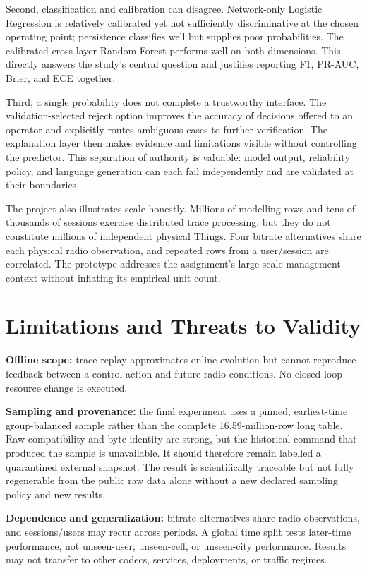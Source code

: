\documentclass[10pt,conference]{IEEEtran}
\begin{document}
Second, classification and calibration can disagree.  Network-only Logistic
Regression is relatively calibrated yet not sufficiently discriminative at
the chosen operating point; persistence classifies well but supplies poor
probabilities.  The calibrated cross-layer Random Forest performs well on both
dimensions.  This directly answers the study's central question and justifies
reporting F1, PR-AUC, Brier, and ECE together.

Third, a single probability does not complete a trustworthy interface.  The
validation-selected reject option improves the accuracy of decisions offered
to an operator and explicitly routes ambiguous cases to further verification.
The explanation layer then makes evidence and limitations visible without
controlling the predictor.  This separation of authority is valuable: model
output, reliability policy, and language generation can each fail independently
and are validated at their boundaries.

The project also illustrates scale honestly.  Millions of modelling rows and
tens of thousands of sessions exercise distributed trace processing, but they
do not constitute millions of independent physical Things.  Four bitrate
alternatives share each physical radio observation, and repeated rows from a
user/session are correlated.  The prototype addresses the assignment's
large-scale management context without inflating its empirical unit count.

\section{Limitations and Threats to Validity}

\textbf{Offline scope:} trace replay approximates online evolution but cannot
reproduce feedback between a control action and future radio conditions.  No
closed-loop resource change is executed.

\textbf{Sampling and provenance:} the final experiment uses a pinned,
earliest-time group-balanced sample rather than the complete 16.59-million-row
long table.  Raw compatibility and byte identity are strong, but the historical
command that produced the sample is unavailable.  It should therefore remain
labelled a quarantined external snapshot.  The result is scientifically
traceable but not fully regenerable from the public raw data alone without a
new declared sampling policy and new results.

\textbf{Dependence and generalization:} bitrate alternatives share radio
observations, and sessions/users may recur across periods.  A global time split
tests later-time performance, not unseen-user, unseen-cell, or unseen-city
performance.  Results may not transfer to other codecs, services, deployments,
or traffic regimes.
\end{document}
